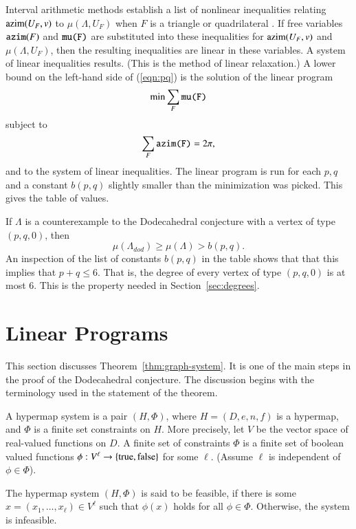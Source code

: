 Interval arithmetic methods establish a list of nonlinear inequalities relating
${\operatorname{azim}}(U_F,v)$ to $\mu(\Lambda,U_F)$ when $F$ is a triangle or quadrilateral \cite[XX]{code}.
If free variables ${\operatorname{{\texttt{azim}}}}(F)$ and ${\operatorname{{\texttt{mu(F)}}}}$ are substituted into these inequalities
for  ${\operatorname{azim}}(U_F,v)$ and $\mu(\Lambda,U_F)$, then the resulting inequalities are
linear in these variables.   A system of linear inequalities results. 
(This is the method of linear relaxation.)  A lower bound
on the left-hand side of (\ref{eqn:pq}) is the solution of the linear program
$$
\min \sum_F {\operatorname{{\texttt{mu(F)}}}}
$$
subject to 
$$
\sum_F {\operatorname{{\texttt{azim(F)}}}} = 2\pi,
$$
and to the system of linear inequalities.  The linear program is run for
each $p,q$ and a constant $b(p,q)$ slightly smaller than the minimization was picked.
This gives the table of values.

If $\Lambda$ is a counterexample to the Dodecahedral conjecture with a vertex
of type $(p,q,0)$, then
$$\mu(\Lambda_{dod}) \ge \mu(\Lambda) > b(p,q).$$
An inspection of the list of constants $b(p,q)$ in the table shows that that this implies
that $p+q\le 6$.  That is, the degree of every vertex of type $(p,q,0)$
is at most $6$.  This
is the property needed in Section~\ref{sec:degrees}.



\section{Linear Programs}

This section discusses Theorem~\ref{thm:graph-system}.  It is one of
the main steps in the proof of the Dodecahedral conjecture.
The discussion begins with the terminology used in the
statement of the theorem.

\begin{definition} A hypermap system is a pair $(H,\Phi)$,
where $H=(D,e,n,f)$ is a hypermap, and $\Phi$ is a finite set constraints on $H$.  More precisely, let $V$ be the vector space of
real-valued functions on $D$.  A finite set of constraints $\Phi$ is a finite
set of boolean valued functions $\phi:V^\ell\to \{{\operatorname{true}},{\operatorname{false}}\}$
for some $\ell$. (Assume $\ell$ is independent of $\phi\in \Phi$).
\end{definition}

The hypermap system $(H,\Phi)$ is said to be feasible, if
there is some $x=(x_1,\ldots,x_\ell)\in V^\ell$ such that
$\phi(x)$ holds for all $\phi\in\Phi$. Otherwise,  
the system is infeasible.

